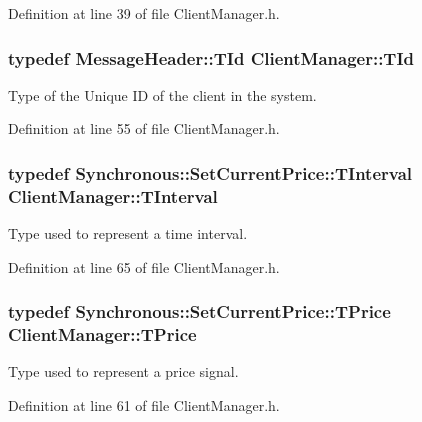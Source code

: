 Definition at line 39 of file Client\-Manager.\-h.

\hypertarget{class_client_manager_a531e5e7eb779e8ce3c47b8eabd8e9b17}{
\subsubsection[{T\-Id}]{\setlength{\rightskip}{0pt plus 5cm}typedef {\bf Message\-Header\-::\-T\-Id} {\bf Client\-Manager\-::\-T\-Id}\hspace{0.3cm}{\ttfamily [private]}}}\label{class_client_manager_a531e5e7eb779e8ce3c47b8eabd8e9b17}
Type of the Unique I\-D of the client in the system. 

Definition at line 55 of file Client\-Manager.\-h.

\hypertarget{class_client_manager_a429cc3229a8121c83655945ebaec18a6}{
\subsubsection[{T\-Interval}]{\setlength{\rightskip}{0pt plus 5cm}typedef {\bf Synchronous\-::\-Set\-Current\-Price\-::\-T\-Interval} {\bf Client\-Manager\-::\-T\-Interval}}}\label{class_client_manager_a429cc3229a8121c83655945ebaec18a6}
Type used to represent a time interval. 

Definition at line 65 of file Client\-Manager.\-h.

\hypertarget{class_client_manager_ae957a71b432eb6d9d39b0f397cd89874}{
\subsubsection[{T\-Price}]{\setlength{\rightskip}{0pt plus 5cm}typedef {\bf Synchronous\-::\-Set\-Current\-Price\-::\-T\-Price} {\bf Client\-Manager\-::\-T\-Price}}}\label{class_client_manager_ae957a71b432eb6d9d39b0f397cd89874}
Type used to represent a price signal. 

Definition at line 61 of file Client\-Manager.\-h.



